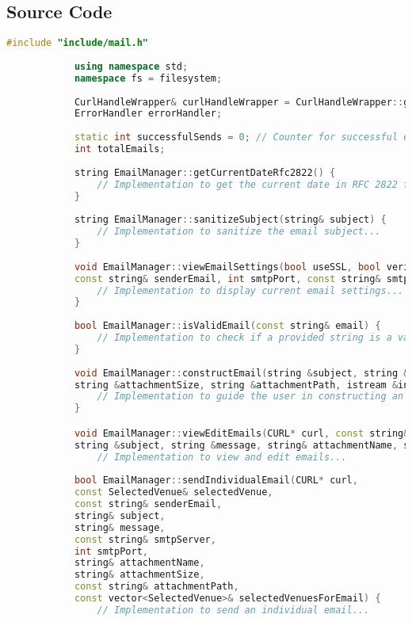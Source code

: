 \documentclass{article}
\begin{document}
	\subsection*{Source Code}
	\begin{mdframed}[backgroundcolor=background, hidealllines=false, innerleftmargin=15pt, innerrightmargin=5pt, innertopmargin=0pt, innerbottommargin=-5pt]
		\begin{lstlisting}[language=C++]
			#include "include/mail.h"
			
			using namespace std;
			namespace fs = filesystem;
			
			CurlHandleWrapper& curlHandleWrapper = CurlHandleWrapper::getInstance();
			ErrorHandler errorHandler;
			
			static int successfulSends = 0; // Counter for successful email sends
			int totalEmails;
			
			string EmailManager::getCurrentDateRfc2822() {
				// Implementation to get the current date in RFC 2822 format...
			}
			
			string EmailManager::sanitizeSubject(string& subject) {
				// Implementation to sanitize the email subject...
			}
			
			void EmailManager::viewEmailSettings(bool useSSL, bool verifyPeer, bool verifyHost, bool verbose,
			const string& senderEmail, int smtpPort, const string& smtpServer) {
				// Implementation to display current email settings...
			}
			
			bool EmailManager::isValidEmail(const string& email) {
				// Implementation to check if a provided string is a valid email format...
			}
			
			void EmailManager::constructEmail(string &subject, string &message, string &attachmentName, 
			string &attachmentSize, string &attachmentPath, istream &in) {
				// Implementation to guide the user in constructing an email...
			}

			void EmailManager::viewEditEmails(CURL* curl, const string& smtpServer, int smtpPort, const vector<SelectedVenue>& selectedVenuesForEmail, const string& senderEmail, 
			string &subject, string &message, string& attachmentName, string& attachmentSize, string& attachmentPath, bool& templateExists) {
				// Implementation to view and edit emails...
				
			bool EmailManager::sendIndividualEmail(CURL* curl,
			const SelectedVenue& selectedVenue,
			const string& senderEmail,
			string& subject,
			string& message,
			const string& smtpServer,
			int smtpPort,
			string& attachmentName,
			string& attachmentSize,
			const string& attachmentPath,
			const vector<SelectedVenue>& selectedVenuesForEmail) {
				// Implementation to send an individual email...
			

\end{lstlisting}
\end{mdframed}
\end{document}
